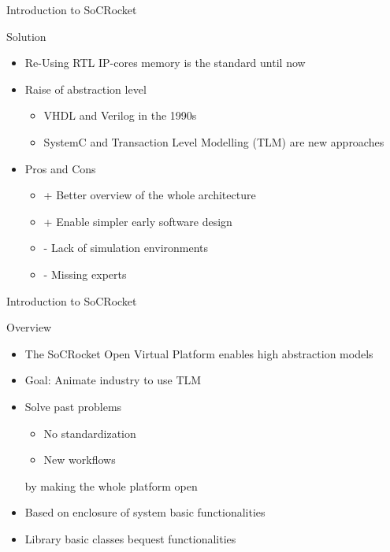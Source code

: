 \begin{frame}{Introduction to SoCRocket}
\begin{block}{Solution}
  \begin{itemize}
		\item	Re-Using RTL IP-cores memory is the standard until now
		\item Raise of abstraction level
			\begin{itemize}
				\item VHDL and Verilog in the 1990s
				\item	SystemC and Transaction Level Modelling (TLM) are new approaches
			\end{itemize}
		\item Pros and Cons
			\begin{itemize}
				\item + Better overview of the whole architecture
				\item + Enable simpler early software design
				\item - Lack of simulation environments
				\item - Missing experts
			\end{itemize}
		\end{itemize}
\end{block}
\end{frame}


\begin{frame}{Introduction to SoCRocket}
\begin{block}{Overview}
  \begin{itemize}
		\item The SoCRocket Open Virtual Platform enables high abstraction models
		\item Goal: Animate industry to use TLM
		\item Solve past problems 
			\begin{itemize}
				\item No standardization
				\item New workflows
			\end{itemize} 
			by making the whole platform open
		\item Based on enclosure of system basic functionalities 
		\item Library basic classes bequest functionalities
	\end{itemize}
\end{block}
\end{frame}


